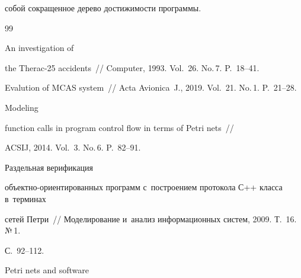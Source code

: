 собой со\-кра\-щен\-ное дерево до\-сти\-жи\-мости программы.





{\small\frenchspacing


{\baselineskip=10.5pt




\begin{thebibliography}{99}










 An investigation of 


the Therac-25 accidents~/\!\!/ Computer, 1993. Vol.~26. No.\,7. P.~18--41.


    






Evalution of MCAS system~/\!\!/ Acta Avionica~J., 2019. Vol.~21. No.\,1. P.~21--28.


    






 Modeling 


function calls in program control flow in terms of Petri nets~/\!\!/ 


ACSIJ, 2014. Vol.~3. No.\,6. P.~82--91.


    




 Раздельная верификация 


объ\-ект\-но-ори\-ен\-ти\-ро\-ва\-нных программ с~по\-стро\-ени\-ем протокола С++ клас\-са в~терминах 


сетей Пет\-ри~/\!\!/ Моделирование и~анализ информационных сис\-тем, 2009. Т.~16. №\,1. 


С.~92--112.


    






Petri nets and software 



\end{thebibliography}}}
